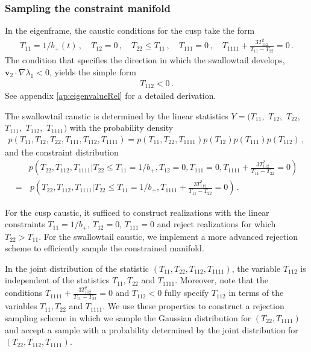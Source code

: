 \documentclass[a4paper, 11pt]{article}
\begin{document}
\subsubsection{Sampling the constraint manifold}
In the eigenframe, the caustic conditions for the cusp take the form
\begin{align}
T_{11}=1/b_+(t)\,, \quad T_{12}=0\,,\quad T_{22}\leq T_{11}\,,\quad T_{111}=0\,, \quad T_{1111}+\frac{3T_{112}^2}{T_{11}-T_{22}} =0\,.
\end{align}
The condition that specifies the direction in which the swallowtail develops, $\bm{v}_2 \cdot \nabla \lambda_1  <0$, yields the simple form 
\begin{align}
T_{112} <0\,.
\end{align}
See appendix \ref{ap:eigenvalueRel} for a detailed derivation. 

The swallowtail caustic is determined by the linear statistics $Y=(T_{11},$ $T_{12},$ $T_{22},$ $T_{111},$ $T_{112},$ $T_{1111})$ with the probability density
\begin{align}
p(T_{11},T_{12},T_{22},T_{111},T_{112},T_{1111})=p(T_{11},T_{22},T_{1111})p(T_{12})p(T_{111})p(T_{112})\,,
\end{align}
and the constraint distribution 
\begin{align}
&p\left(T_{22},T_{112},T_{1111}|T_{22}\leq T_{11}=1/b_+, T_{12}=0,T_{111}=0,T_{1111}+\frac{3T_{112}^2}{T_{11}-T_{22}}=0\right)\nonumber\\
=&\, p\left(T_{22},T_{112}, T_{1111}|T_{22}\leq T_{11}=1/b_+, T_{1111}+\frac{3T_{112}^2}{T_{11}-T_{22}}=0\right)\,.
\end{align}

For the cusp caustic, it sufficed to construct realizations with the linear constraints $T_{11}=1/b_+$, $T_{12}=0$, $T_{111}=0$ and reject realizations for which $T_{22} > T_{11}$. For the swallowtail caustic, we implement a more advanced rejection scheme to efficiently sample the constrained manifold.

In the joint distribution of the statistic $(T_{11},T_{22},T_{112},T_{1111})$, the variable $T_{112}$ is independent of the statistics $T_{11}, T_{22}$ and $T_{1111}$. Moreover, note that the conditions $T_{1111}+\frac{3T_{112}^2}{T_{11}-T_{22}}=0$ and $T_{112}<0$ fully specify $T_{112}$ in terms of the variables $T_{11},T_{22}$ and $T_{1111}$. We use these properties to construct a rejection sampling scheme in which we sample the Gaussian distribution for $(T_{22},T_{1111})$ and accept a sample with a probability determined by the joint distribution for $(T_{22},T_{112},T_{1111})$.
\end{document}
